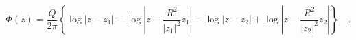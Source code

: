 \begin{equation}
\Phi(z)=\frac{Q}{2\pi}\left\{\log|z-z_1|-\log\left|z-\frac{R^2}{|z_1|^2}z_1\right| - \log|z-z_2|+\log\left|z-\frac{R^2}{|z_2|^2}z_2\right|\right\}\quad.
\label{phidisc}
\end{equation}

